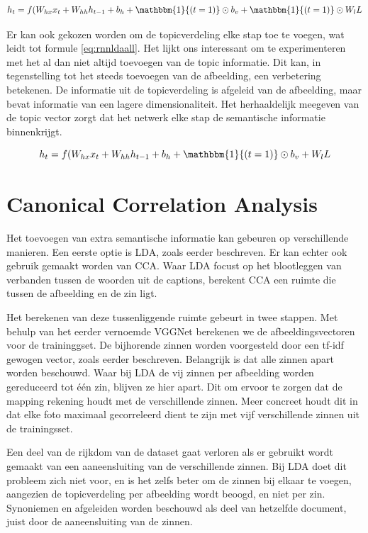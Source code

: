 \begin{equation}
    h_t = f(W_{hx} x_{t} + W_{hh} h_{t-1} + b_h + \mathbbm{1}{(t=1)} \odot b_v +\mathbbm{1}{(t=1)} \odot W_lL
    \label{eq:rnnldaonce}
\end{equation}

Er kan ook gekozen worden om de topicverdeling elke stap toe te voegen, wat leidt tot formule \eqref{eq:rnnldaall}. Het lijkt ons interessant om te experimenteren met het al dan niet altijd toevoegen van de topic informatie. Dit kan, in tegenstelling tot het steeds toevoegen van de afbeelding, een verbetering betekenen. De informatie uit de topicverdeling is afgeleid van de afbeelding, maar bevat informatie van een lagere dimensionaliteit. Het herhaaldelijk meegeven van de topic vector zorgt dat het netwerk elke stap de semantische informatie binnenkrijgt.


\begin{equation}
    h_t = f(W_{hx} x_{t} + W_{hh} h_{t-1} + b_h + \mathbbm{1}{(t=1)} \odot b_v + W_lL
    \label{eq:rnnldaall}
\end{equation}



\section{Canonical Correlation Analysis}
Het toevoegen van extra semantische informatie kan gebeuren op verschillende manieren. Een eerste optie is LDA, zoals eerder beschreven. Er kan echter ook gebruik gemaakt worden van CCA. Waar LDA focust op het blootleggen van verbanden tussen de woorden uit de captions, berekent CCA een ruimte die tussen de afbeelding en de zin ligt.

Het berekenen van deze tussenliggende ruimte gebeurt in twee stappen. Met behulp van het eerder vernoemde VGGNet berekenen we de afbeeldingsvectoren voor de traininggset. De bijhorende zinnen worden voorgesteld door een tf-idf gewogen vector, zoals eerder beschreven. Belangrijk is dat alle zinnen apart worden beschouwd. Waar bij LDA de vij zinnen per afbeelding worden gereduceerd tot \'e\'en zin, blijven ze hier apart. Dit om ervoor te zorgen dat de mapping rekening houdt met de verschillende zinnen. Meer concreet houdt dit in dat elke foto maximaal gecorreleerd dient te zijn met vijf verschillende zinnen uit de trainingsset.

Een deel van de rijkdom van de dataset gaat verloren als er gebruikt wordt gemaakt van een aaneensluiting van de verschillende zinnen. Bij LDA doet dit probleem zich niet voor, en is het zelfs beter om de zinnen bij elkaar te voegen, aangezien de topicverdeling per afbeelding wordt beoogd, en niet per zin. Synoniemen en afgeleiden worden beschouwd als deel van hetzelfde document, juist door de aaneensluiting van de zinnen.


